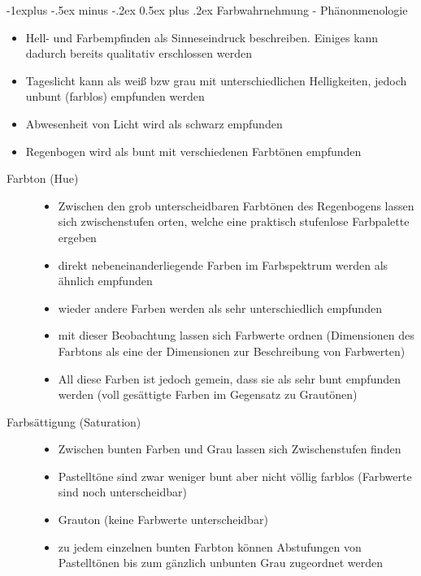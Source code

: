 \documentclass[10pt,landscape]{article}
\makeatletter
\renewcommand{\subsection}{\@startsection{subsection}{2}{0mm}%
                                {-1explus -.5ex minus -.2ex}%
                                {0.5ex plus .2ex}%
                                {\normalfont\normalsize\bfseries}}
\makeatother
\begin{document}
\begin{multicols}{3}
  \subsection{ Farbwahrnehmung - Phänonmenologie}
  \begin{itemize}
    \item Hell- und Farbempfinden als Sinneseindruck beschreiben. Einiges kann dadurch bereits qualitativ erschlossen werden
    \item Tageslicht kann als weiß bzw grau mit unterschiedlichen Helligkeiten, jedoch unbunt (farblos) empfunden werden
    \item Abwesenheit von Licht wird als schwarz empfunden
    \item Regenbogen wird als bunt mit verschiedenen Farbtönen empfunden
  \end{itemize}
  \begin{description}
    \item[Farbton (Hue)]
          \begin{itemize}
            \item Zwischen den grob unterscheidbaren Farbtönen des Regenbogens lassen sich zwischenstufen orten, welche eine praktisch stufenlose Farbpalette ergeben
            \item direkt nebeneinanderliegende Farben im Farbspektrum werden als ähnlich empfunden
            \item wieder andere Farben werden als sehr unterschiedlich empfunden
            \item mit dieser Beobachtung lassen sich Farbwerte ordnen (Dimensionen des Farbtons als eine der Dimensionen zur Beschreibung von Farbwerten)
            \item All diese Farben ist jedoch gemein, dass sie als sehr bunt empfunden werden (voll gesättigte Farben im Gegensatz zu Grautönen)
          \end{itemize}
    \item[Farbsättigung (Saturation)]
          \begin{itemize}
            \item  Zwischen bunten Farben und Grau lassen sich Zwischenstufen finden
            \item Pastelltöne sind zwar weniger bunt aber nicht völlig farblos (Farbwerte sind noch unterscheidbar)
            \item Grauton (keine Farbwerte unterscheidbar)
            \item zu jedem einzelnen bunten Farbton können Abstufungen von Pastelltönen bis zum gänzlich unbunten Grau zugeordnet werden

\end{itemize}
\end{description}
\end{multicols}
\end{document}
